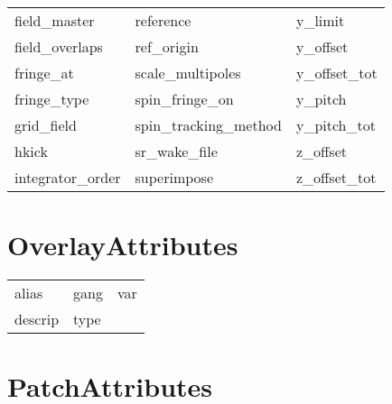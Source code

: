 \begin{tabular}{lll}
field_master                & reference                   & y_limit                     \\
field_overlaps              & ref_origin                  & y_offset                    \\
fringe_at                   & scale_multipoles            & y_offset_tot                \\
fringe_type                 & spin_fringe_on              & y_pitch                     \\
grid_field                  & spin_tracking_method        & y_pitch_tot                 \\
hkick                       & sr_wake_file                & z_offset                    \\
integrator_order            & superimpose                 & z_offset_tot                \\
 \bottomrule
 \end{tabular}
 \vfill
 
 \section{OverlayAttributes}
 \label{s:list.overlay}
 
 \begin{tabular}{lll} \toprule
alias                       & gang                        & var                         \\
descrip                     & type                        &                             \\
 \bottomrule
 \end{tabular}
 \vfill
 
 \section{PatchAttributes}
 \label{s:list.patch}
 

